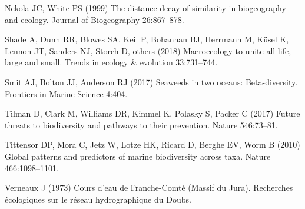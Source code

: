 \documentclass[
  12pt,
]{book}
\newlength{\cslhangindent}
\newenvironment{CSLReferences}[2] %
 {\begin{list}{}{%
  \setlength{\itemindent}{0pt}
  \setlength{\leftmargin}{0pt}
  \setlength{\parsep}{0pt}
  \ifodd #1
   \setlength{\leftmargin}{\cslhangindent}
   \setlength{\itemindent}{-1\cslhangindent}
  \fi
  \setlength{\itemsep}{#2\baselineskip}}}
 {\end{list}}
\begin{document}
\begin{CSLReferences}{1}{1}
Nekola JC, White PS (1999) The distance decay of similarity in
biogeography and ecology. {Journal of Biogeography} 26:867--878.

Shade A, Dunn RR, Blowes SA, Keil P, Bohannan BJ, Herrmann M, Küsel K,
Lennon JT, Sanders NJ, Storch D, others (2018) Macroecology to unite all
life, large and small. Trends in ecology \& evolution 33:731--744.

Smit AJ, Bolton JJ, Anderson RJ (2017) Seaweeds in two oceans:
Beta-diversity. {Frontiers in Marine Science} 4:404.

Tilman D, Clark M, Williams DR, Kimmel K, Polasky S, Packer C (2017)
Future threats to biodiversity and pathways to their prevention. Nature
546:73--81.

Tittensor DP, Mora C, Jetz W, Lotze HK, Ricard D, Berghe EV, Worm B
(2010) Global patterns and predictors of marine biodiversity across
taxa. Nature 466:1098--1101.

Verneaux J (1973) Cours d'eau de {F}ranche-{C}omt{é} ({M}assif du
{J}ura). Recherches {é}cologiques sur le r{é}seau hydrographique du
{D}oubs.

\end{CSLReferences}


\backmatter
\end{document}

